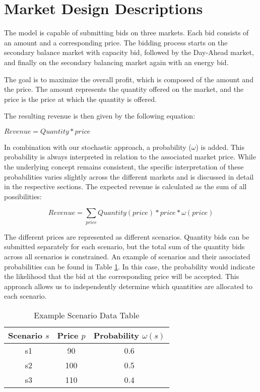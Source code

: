 \section{Market Design Descriptions}
\label{chap:marketDesignDescription}

The model is capable of submitting bids on three markets. Each bid consists of an amount and a corresponding price.
The bidding process starts on the secondary balance market with capacity bid, followed by the Day-Ahead market,
and finally on the secondary balancing market again with an energy bid.

The goal is to maximize the overall profit, which is composed of the amount and the price.
The amount represents the quantity offered on the market, and the price is the price at which the quantity is offered.

The resulting revenue is then given by the following equation:

$Revenue = Quantity * price$

In combination with our stochastic approach, a probability ($\omega$) is added.
This probability is always interpreted in relation to the associated market price.
While the underlying concept remains consistent, the specific interpretation of these probabilities
varies slightly across the different markets and is discussed in detail in the respective sections.
The expected revenue is calculated as the sum of all possibilities:

\begin{equation}
	Revenue = \sum_{price} Quantity(price) * price * \omega(price)
\end{equation}

The different prices are represented as different scenarios. Quantity bids can be submitted separately for each scenario,
but the total sum of the quantity bids across all scenarios is constrained.
An example of scenarios and their associated probabilities can be found in Table \ref{tab:example_scenario}.
In this case, the probability would indicate the likelihood that the bid at the corresponding price will be accepted.
This approach allows us to independently determine which quantities are allocated to each scenario.\\

\begin{table}[H]
	\centering
	\begin{tabular}{c|c|c}

		\textbf{Scenario} $s$ & \textbf{Price $p$} & \textbf{Probability $\omega(s)$} \\
		\hline
		s1                    & 90                 & 0.6                              \\
		s2                    & 100                & 0.5                              \\
		s3                    & 110                & 0.4                              \\
	\end{tabular}\\
	\caption{Example Scenario Data Table}
	\label{tab:example_scenario}
\end{table}

